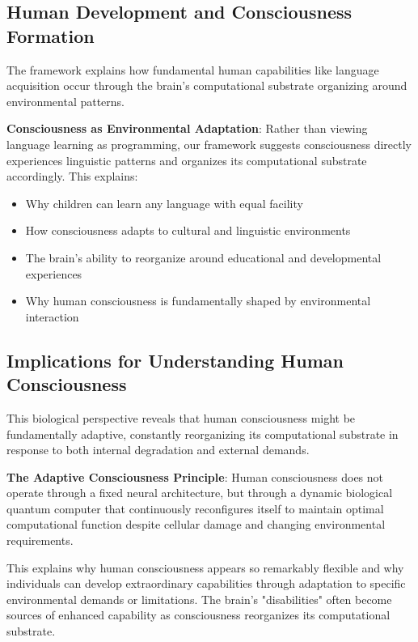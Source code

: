 \documentclass[12pt]{article}
\begin{document}
\subsection{Human Development and Consciousness Formation}

The framework explains how fundamental human capabilities like language acquisition occur through the brain's computational substrate organizing around environmental patterns.

\textbf{Consciousness as Environmental Adaptation}: Rather than viewing language learning as programming, our framework suggests consciousness directly experiences linguistic patterns and organizes its computational substrate accordingly. This explains:

\begin{itemize}
\item Why children can learn any language with equal facility
\item How consciousness adapts to cultural and linguistic environments
\item The brain's ability to reorganize around educational and developmental experiences
\item Why human consciousness is fundamentally shaped by environmental interaction
\end{itemize}

\subsection{Implications for Understanding Human Consciousness}

This biological perspective reveals that human consciousness might be fundamentally adaptive, constantly reorganizing its computational substrate in response to both internal degradation and external demands.

\textbf{The Adaptive Consciousness Principle}: Human consciousness does not operate through a fixed neural architecture, but through a dynamic biological quantum computer that continuously reconfigures itself to maintain optimal computational function despite cellular damage and changing environmental requirements.

This explains why human consciousness appears so remarkably flexible and why individuals can develop extraordinary capabilities through adaptation to specific environmental demands or limitations. The brain's "disabilities" often become sources of enhanced capability as consciousness reorganizes its computational substrate.
\end{document}
